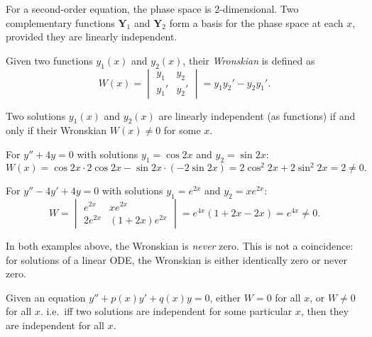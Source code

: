 \documentclass[a4paper]{article}
\begin{document}
\begin{remark}
  For a second-order equation, the phase space is 2-dimensional. Two complementary functions $\mathbf{Y}_1$ and $\mathbf{Y}_2$ form a basis for the phase space at each $x$, provided they are linearly independent.
\end{remark}

\begin{defi}[Wronskian]
  Given two functions $y_1(x)$ and $y_2(x)$, their \emph{Wronskian} is defined as
  \[
    W(x) = \begin{vmatrix}y_1 & y_2 \\ y_1' & y_2'\end{vmatrix} = y_1 y_2' - y_2 y_1'.
  \]
\end{defi}

\begin{prop}
  Two solutions $y_1(x)$ and $y_2(x)$ are linearly independent (as functions) if and only if their Wronskian $W(x) \neq 0$ for some $x$.
\end{prop}

\begin{eg}
  For $y'' + 4y = 0$ with solutions $y_1 = \cos 2x$ and $y_2 = \sin 2x$:
  \[
    W(x) = \cos 2x \cdot 2\cos 2x - \sin 2x \cdot (-2\sin 2x) = 2\cos^2 2x + 2\sin^2 2x = 2 \neq 0.
  \]
\end{eg}

\begin{eg}
  For $y'' - 4y' + 4y = 0$ with solutions $y_1 = e^{2x}$ and $y_2 = xe^{2x}$:
  \[
    W = \begin{vmatrix} e^{2x} & xe^{2x}\\ 2e^{2x} & (1 + 2x)e^{2x} \end{vmatrix} = e^{4x}(1 + 2x - 2x) = e^{4x} \neq 0.
  \]
\end{eg}

\begin{remark}
  In both examples above, the Wronskian is \emph{never} zero. This is not a coincidence: for solutions of a linear ODE, the Wronskian is either identically zero or never zero.
\end{remark}

\begin{thm}
  Given an equation $y'' + p(x)y' + q(x) y = 0$, either $W = 0$ for all $x$, or $W \not= 0$ for all $x$. i.e.\ iff two solutions are independent for some particular $x$, then they are independent for all $x$.
\end{thm}
\end{document}
